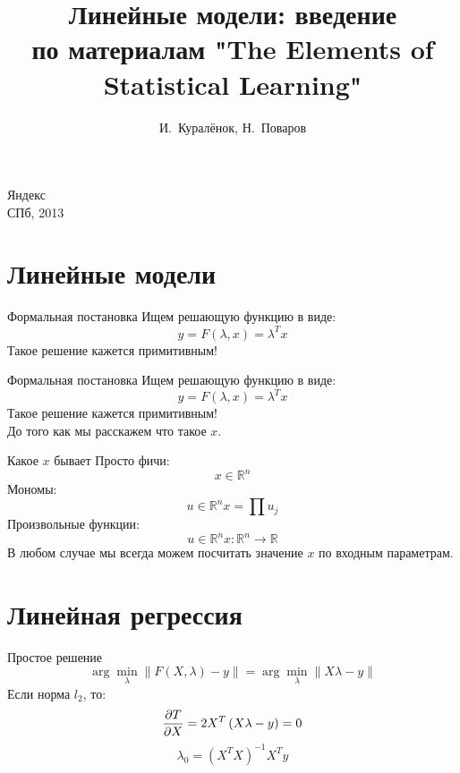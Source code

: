\documentclass[14pt, fleqn, xcolor={dvipsnames, table}]{beamer}
\title{Линейные модели: введение\\\small{по материалам "The Elements of Statistical Learning"}}
\author[]{\small{%
И.~Куралёнок,
Н.~Поваров}}
\date{}
\begin{document}
\begin{frame}
\maketitle
\small
\begin{center}
\vspace{-60pt}
\normalsize {\color{red}Я}ндекс \\
\vspace{80pt}
\footnotesize СПб, 2013
\end{center}
\end{frame}

\section{Линейные модели}
\begin{frame}{Формальная постановка}
Ищем решающую функцию в виде:
$$
y = F(\lambda, x) = \lambda^T x
$$
Такое решение кажется примитивным!
\end{frame}
\begin{frame}{Формальная постановка}
Ищем решающую функцию в виде:
$$
y = F(\lambda, x) = \lambda^T x
$$
Такое решение кажется примитивным! \\
До того как мы расскажем что такое $x$.
\end{frame}
\begin{frame}{Какое $x$ бывает}
Просто фичи:
$$
x \in \mathbb{R}^n
$$
Мономы:
$$
u \in \mathbb{R}^n
x = \prod u_j
$$
Произвольные функции:
$$
u \in \mathbb{R}^n
x: \mathbb{R}^n \to \mathbb{R}
$$
В любом случае мы всегда можем посчитать значение $x$ по входным параметрам.
\end{frame}

\section{Линейная регрессия}
\begin{frame}{Простое решение}
$$
\arg \min_{\lambda} \|F(X, \lambda) - y\| = \arg \min_{\lambda} \|X \lambda - y\|
$$
Если норма $l_2$, то:
$$
{\partial T \over \partial X} = 2 X^T\left(X\lambda - y\right) = 0
$$
$$
\lambda_0 = (X^TX)^{-1}X^Ty
$$
\end{frame}
\end{document}
